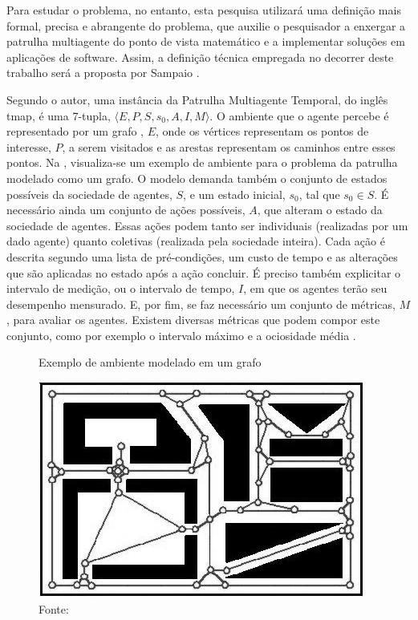 Para estudar o problema, no entanto, esta pesquisa utilizará uma definição mais 
formal, precisa e abrangente do problema, que auxilie o pesquisador a enxergar 
a patrulha multiagente do ponto de vista matemático e a implementar soluções em 
aplicações de software. Assim, a definição técnica empregada no decorrer deste 
trabalho será a proposta por Sampaio \citep{sampaiophd}.

Segundo o autor, uma instância da Patrulha Multiagente Temporal, do inglês 
\ac{tmap}, é uma 7-tupla, $ \langle E, P, S, s_{0}, A, I, M \rangle $. O 
ambiente que o agente percebe é representado por um grafo 
\citep{Rosen:2002:DMA:579402}, $E$, onde os vértices representam os pontos de 
interesse, $P$, a serem visitados e as arestas representam os caminhos entre 
esses pontos. Na , visualiza-se um exemplo de ambiente 
para o problema da patrulha modelado como um grafo. O modelo demanda também o 
conjunto de estados possíveis da sociedade de agentes, $S$, e um estado inicial, 
$ s_{0} $, tal que $ s_{0} \in S $. É necessário ainda um conjunto de ações 
possíveis, $A$, que alteram o estado da sociedade de agentes. Essas ações podem 
tanto ser individuais (realizadas por um dado agente) quanto coletivas 
(realizada pela sociedade inteira). Cada ação é descrita segundo uma lista de 
pré-condições, um custo de tempo e as alterações que são aplicadas no estado 
após a ação concluir. É preciso também explicitar o intervalo de medição, ou o 
intervalo de tempo, $I$, em que os agentes terão seu desempenho mensurado. E, 
por fim, se faz necessário um conjunto de métricas, $M$, para avaliar os 
agentes. Existem diversas métricas que podem compor este conjunto, como por 
exemplo o intervalo máximo \citep{Chevaleyre:2004:TAM:1018411.1019013} e 
a ociosidade média \citep{hernandez2013game}.

\begin{figure}[tp]
	\caption[Exemplo de ambiente modelado em um grafo]{Exemplo de ambiente 
		modelado em um grafo}
	\centering
	\includegraphics[width=0.75\columnwidth]{images/grafoExemplo.png}
	\caption*{Fonte: \citep{machado2002b}}
	\label{fig:graphexample}
\end{figure}

